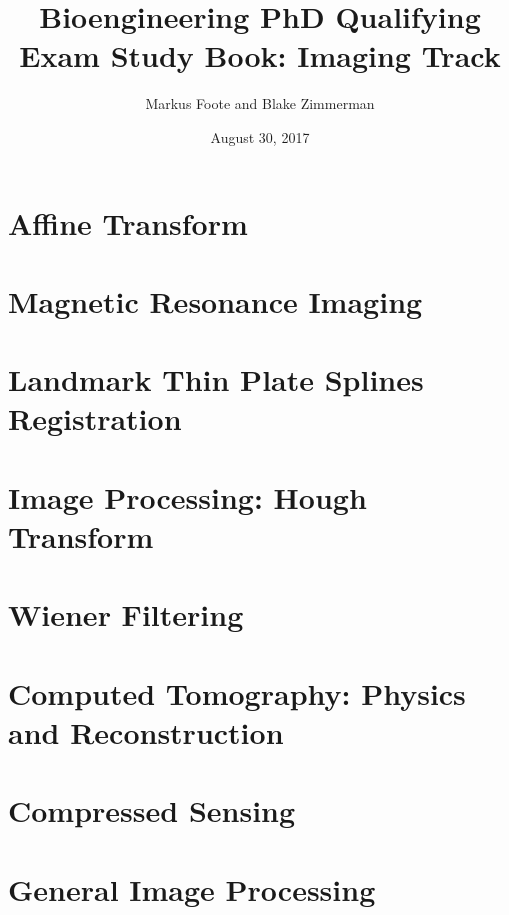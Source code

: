 \documentclass{report}
\title{Bioengineering PhD Qualifying Exam Study Book: Imaging Track}
\author{Markus Foote and Blake Zimmerman}
\date{August 30, 2017}
\begin{document}
	\maketitle
	\setcounter{tocdepth}{1} %
	\tableofcontents

	\chapter{Affine Transform}
	
	
	\chapter{Magnetic Resonance Imaging}
	
	\chapter{Landmark Thin Plate Splines Registration}
	
	\chapter{Image Processing: Hough Transform}
	
	\chapter{Wiener Filtering}
	
	\chapter{Computed Tomography: Physics and Reconstruction}
	

	\chapter{Compressed Sensing}
	

	\chapter{General Image Processing}
	
	
	
	
		
\end{document}
